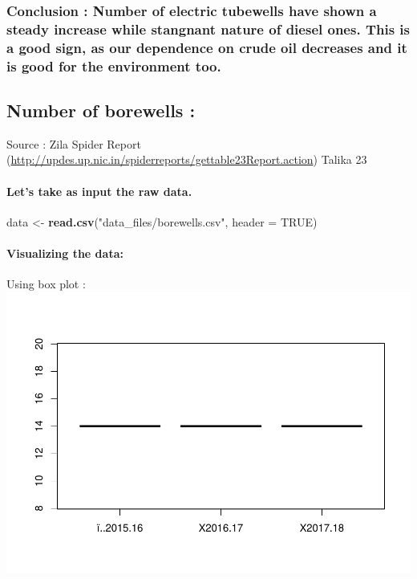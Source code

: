 \documentclass[]{article}
\newenvironment{Shaded}{\begin{snugshade}}{\end{snugshade}}
\newcommand{\KeywordTok}[1]{\textcolor[rgb]{0.13,0.29,0.53}{\textbf{#1}}}
\newcommand{\DataTypeTok}[1]{\textcolor[rgb]{0.13,0.29,0.53}{#1}}
\newcommand{\StringTok}[1]{\textcolor[rgb]{0.31,0.60,0.02}{#1}}
\newcommand{\OtherTok}[1]{\textcolor[rgb]{0.56,0.35,0.01}{#1}}
\newcommand{\NormalTok}[1]{#1}
\let\oldparagraph\paragraph
\renewcommand{\paragraph}[1]{\oldparagraph{#1}\mbox{}}
\begin{document}
\subsubsection{\texorpdfstring{\textbf{Conclusion} : Number of electric
tubewells have shown a steady increase while stangnant nature of diesel
ones. This is a good sign, as our dependence on crude oil decreases and
it is good for the environment
too.}{Conclusion : Number of electric tubewells have shown a steady increase while stangnant nature of diesel ones. This is a good sign, as our dependence on crude oil decreases and it is good for the environment too.}}\label{conclusion-number-of-electric-tubewells-have-shown-a-steady-increase-while-stangnant-nature-of-diesel-ones.-this-is-a-good-sign-as-our-dependence-on-crude-oil-decreases-and-it-is-good-for-the-environment-too.}

\subsection{Number of borewells :}\label{number-of-borewells}

Source : Zila Spider Report
(\url{http://updes.up.nic.in/spiderreports/gettable23Report.action})
Talika 23

\paragraph{Let's take as input the raw
data.}\label{lets-take-as-input-the-raw-data.-9}

\begin{Shaded}
\begin{Highlighting}[]
\NormalTok{data <-}\StringTok{ }\KeywordTok{read.csv}\NormalTok{(}\StringTok{"data_files/borewells.csv"}\NormalTok{, }\DataTypeTok{header =} \OtherTok{TRUE}\NormalTok{)}
\end{Highlighting}
\end{Shaded}

\paragraph{Visualizing the data:}\label{visualizing-the-data-9}

Using box plot :
\includegraphics{Report_files/figure-latex/unnamed-chunk-38-1.pdf}
\end{document}
